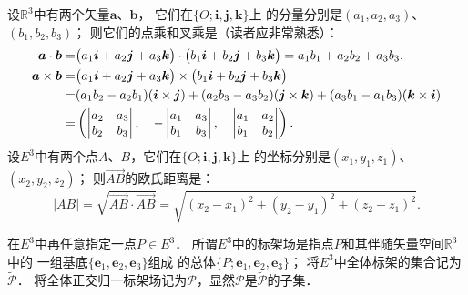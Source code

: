 设$\mathbb{R}^3$中有两个矢量$\boldsymbol{a}$、$\boldsymbol{b}$，
它们在$\{O;\boldsymbol{i},\boldsymbol{j},\boldsymbol{k}\}$上
的分量分别是$(a_1,a_2,a_3)$、$(b_1,b_2,b_3)$；
则它们的{\heiti 点乘}和{\heiti 叉乘}是（读者应非常熟悉）：
\begin{align*}
    \boldsymbol{a}\cdot \boldsymbol{b} = & \bigl(a_1 \boldsymbol{i} +a_2 \boldsymbol{j}+a_3 \boldsymbol{k}\bigr) \cdot
    \bigl(b_1 \boldsymbol{i} +b_2 \boldsymbol{j}+b_3 \boldsymbol{k}\bigr)= a_1 b_1 +a_2 b_2+a_3b_3  . \\
    \boldsymbol{a}\times \boldsymbol{b} = & \bigl(a_1 \boldsymbol{i} +a_2 \boldsymbol{j}+a_3 \boldsymbol{k}\bigr) \times
    \bigl(b_1 \boldsymbol{i} +b_2 \boldsymbol{j}+b_3 \boldsymbol{k}\bigr)  \notag\\
    =&(a_1 b_2 - a_2 b_1) (\boldsymbol{i}\times \boldsymbol{j})
     +(a_2 b_3 - a_3 b_2) (\boldsymbol{j}\times \boldsymbol{k})
     +(a_3 b_1 -a _1 b_3) (\boldsymbol{k}\times \boldsymbol{i} )\\
    =& \left( \begin{vmatrix} a_2 & a_3 \\ b_2 & b_3 \end{vmatrix},\quad
    -\begin{vmatrix} a_1 & a_3 \\ b_1 & b_3 \end{vmatrix},\quad
    \begin{vmatrix} a_1 & a_2 \\ b_1 & b_2 \end{vmatrix}    \right) .
\end{align*}
设$E^3$中有两个点$A$、$B$，它们在$\{O;\boldsymbol{i},\boldsymbol{j},\boldsymbol{k}\}$上
的坐标分别是$(x_1,y_1,z_1)$、$(x_2,y_2,z_2)$；
则$\overrightarrow{AB}$的欧氏{\heiti 距离}是：
\begin{equation}
    |AB|=\sqrt{\overrightarrow{AB} \cdot \overrightarrow{AB}}
    =\sqrt{(x_2 - x_1)^2 + (y_2-y_1)^2 + (z_2-z_1)^2} .
\end{equation}



在$E^3$中再任意指定一点$P\in E^3$．
所谓$E^3$中的{\heiti 标架场}是指点$P$和其伴随矢量空间$\mathbb{R}^3$中的
一组基底$\{\boldsymbol{e}_1,\boldsymbol{e}_2,\boldsymbol{e}_3\}$组成
的总体$\{P;\boldsymbol{e}_1,\boldsymbol{e}_2,\boldsymbol{e}_3\}$；
将$E^3$中全体标架的集合记为$\widetilde{\mathscr{P}}$．
将全体正交归一标架场记为$\mathscr{P}$，显然$\mathscr{P}$是$\widetilde{\mathscr{P}}$的子集．

